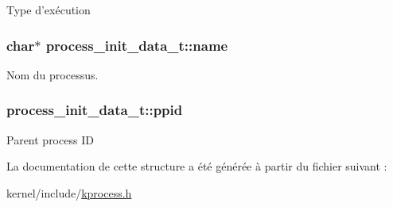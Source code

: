 Type d'exécution \hypertarget{structprocess__init__data__t_a6bdcab0bceaafa6e65a236904fb5a157}{
\subsubsection[{name}]{\setlength{\rightskip}{0pt plus 5cm}char$\ast$ process\+\_\+init\+\_\+data\+\_\+t\+::name}}\label{structprocess__init__data__t_a6bdcab0bceaafa6e65a236904fb5a157}
Nom du processus. \hypertarget{structprocess__init__data__t_a34f85f3f56546700b1dc942070944e27}{
\subsubsection[{ppid}]{ process\+\_\+init\+\_\+data\+\_\+t\+::ppid}}\label{structprocess__init__data__t_a34f85f3f56546700b1dc942070944e27}
Parent process I\+D 

La documentation de cette structure a été générée à partir du fichier suivant \+:\begin{DoxyCompactItemize}
\item 
kernel/include/\hyperlink{kprocess_8h}{kprocess.\+h}\end{DoxyCompactItemize}
